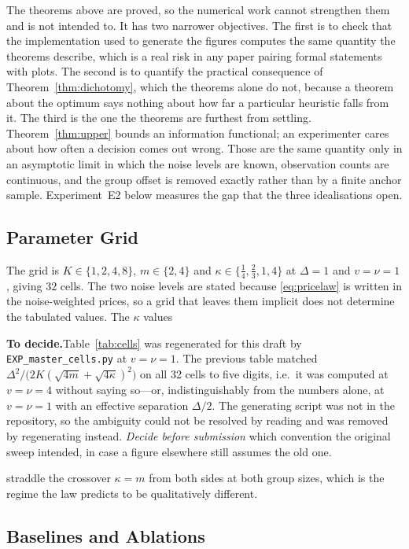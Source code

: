 \documentclass[conference]{IEEEtran}
\theoremstyle{definition}
\newif\ifshownotes\shownotestrue
\newcommand{\TODOPAR}[1]{\ifshownotes\par\vspace{2pt}\noindent%
  {\color{todocol}\textsf{\footnotesize\textbf{To decide.}\;#1}}\par\vspace{2pt}\fi}
\begin{document}
The theorems above are proved, so the numerical work cannot strengthen them and is not
intended to. It has two narrower objectives. The first is to check that the implementation
used to generate the figures computes the same quantity the theorems describe, which is a
real risk in any paper pairing formal statements with plots. The second is to quantify the
practical consequence of Theorem~\ref{thm:dichotomy}, which the theorems alone do not,
because a theorem about the optimum says nothing about how far a particular heuristic falls
from it. The third is the one the theorems are furthest from settling. Theorem~\ref{thm:upper}
bounds an information functional; an experimenter cares about how often a decision comes out
wrong. Those are the same quantity only in an asymptotic limit in which the noise levels are
known, observation counts are continuous, and the group offset is removed exactly rather than
by a finite anchor sample. Experiment~E2 below measures the gap that the three idealisations
open.

\subsection{Parameter Grid}

The grid is $K\in\{1,2,4,8\}$, $m\in\{2,4\}$ and
$\kappa\in\{\tfrac14,\tfrac23,1,4\}$ at $\Delta=1$ and $v=\nu=1$, giving $32$ cells. The
two noise levels are stated because \eqref{eq:pricelaw} is written in the noise-weighted
prices, so a grid that leaves them implicit does not determine the tabulated values. The $\kappa$ values
\TODOPAR{Table~\ref{tab:cells} was regenerated for this draft by
\texttt{EXP\_master\_cells.py} at $v=\nu=1$. The previous table matched
$\Delta^{2}/\bigl(2K(\sqrt{4m}+\sqrt{4\kappa})^{2}\bigr)$ on all 32 cells to five digits,
i.e.\ it was computed at $v=\nu=4$ without saying so---or, indistinguishably from the numbers
alone, at $v=\nu=1$ with an effective separation $\Delta/2$. The generating script was not in
the repository, so the ambiguity could not be resolved by reading and was removed by
regenerating instead. \emph{Decide before submission} which convention the original sweep
intended, in case a figure elsewhere still assumes the old one.}
straddle the crossover $\kappa=m$ from both sides at both group sizes, which is the regime
the law predicts to be qualitatively different.

\subsection{Baselines and Ablations}
\end{document}
